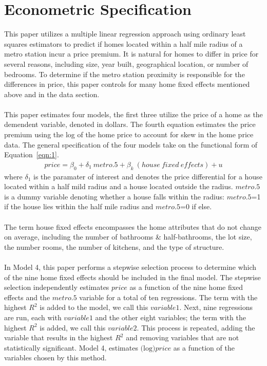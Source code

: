 \documentclass[12pt]{report}
\newcommand\tab[1][.50cm]{\hspace*{#1}}
\begin{document}
\section*{Econometric Specification}
This paper utilizes a multiple linear regression approach using ordinary least squares estimators to predict if homes located within a half mile radius of a metro station incur a price premium. It is natural for homes to differ in price for several reasons, including size, year built, geographical location, or number of bedrooms. To determine if the metro station proximity is responsible for the differences in price, this paper controls for many home fixed effects mentioned above and in the data section.\\  \\
\tab This paper estimates four models, the first three utilize the price of a home as the demendent variable, denoted in dollars. The fourth equation estimates the price premium using the log of the home price to account for skew in the home price data. The general specification of the four models take on the functional form of Equation~\ref{eqn:1}.
\begin{align}
\ price = \beta_0 +\delta_1\ metro.5 + \beta_k\ (house\ fixed\ effects )+ u \ 
\label{eqn:1}
\end{align}
where $\delta_1$ is the paramater of interest and denotes the price differential for a house located within a half mild radius and a house located outside the radius. $metro.5$ is a dummy variable denoting whether a house falls within the radius: $metro.5$=1 if the house lies within the half mile radius and $metro.5$=0 if else.\\  \\
\tab The term house fixed effects encompasses the home attributes that do not change on average, including the number of bathrooms \& half-bathrooms, the lot size, the number rooms, the number of kitchens, and the type of structure.\\ \\
\tab In Model 4, this paper performs a stepwise selection process to determine which of the nine home fixed effects should be included in the final model. The stepwise selection independently estimates $price$ as a function of the nine home fixed effects and the $metro.5$ variable for a total of ten regressions. The term with the highest $R^2$ is added to the model, we call this $variable1$. Next, nine regressions are run, each with $variable1$ and the other eight variables; the term with the highest $R^2$ is added, we call this $variable2$. This process is repeated, adding the variable that results in the highest $R^2$ and removing variables that are not statistically significant. Model 4, estimates $\text{(log)}price$ as a function of the variables chosen by this method. \\ \\
\end{document}
